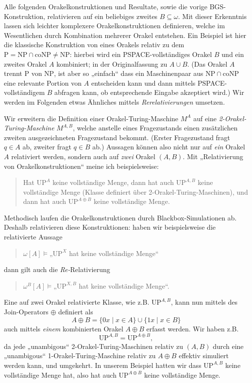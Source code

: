 \documentclass[nofonts]{uebung}
\theoremstyle{definition}
\def\P{\ensuremath{\mathrm{P}}}
\def\NP{\ensuremath{\mathrm{NP}}}
\def\UP{\ensuremath{\mathrm{UP}}}
\def\coNP{\ensuremath{\mathrm{coNP}}}
\begin{document}
Alle folgenden Orakelkonstruktionen und Resultate, sowie die vorige BGS-Konstruktion, relativieren auf ein beliebiges zweites $B\subseteq\omega$.
Mit dieser Erkenntnis lassen sich leichter komplexere Orakelkonstruktionen definieren, welche im Wesentlichen durch Kombination mehrerer Orakel entstehen. Ein Beispiel ist hier die klassische Konstruktion von \citeauthor{baker_relativizations_1975} eines Orakels relativ zu dem $\P=\NP\cap\coNP\neq\NP$: hierbei wird ein PSPACE-vollständiges Orakel $B$ und ein zweites Orakel $A$ kombiniert; in der Originalfassung zu $A\cup B$. (Das Orakel $A$ trennt $\P$ von $\NP$, ist aber so „einfach“ dass ein Maschinenpaar aus $\NP\cap\coNP$ eine relevante Portion von $A$ entscheiden kann und dann mittels PSPACE-vollständigem $B$ abfragen kann, ob entsprechende Eingabe akzeptiert wird.) Wir werden im Folgenden etwas Ähnliches mittels \emph{Rerelativierungen} umsetzen.

Wir erweitern die Definition einer Orakel-Turing-Maschine $M^A$ auf eine \emph{2-Orakel-Turing-Maschine} $M^{A,B}$, welche anstelle eines Fragezustands einen zusätzlichen zweiten ausgezeichneten Fragezustand bekommt. (Erster Fragezustand fragt $q\in A$ ab, zweiter fragt $q\in B$ ab.)
Aussagen können also nicht nur auf \emph{ein} Orakel $A$ relativiert werden, sondern auch auf \emph{zwei} Orakel $(A,B)$.
Mit „Relativierung von Orakelkonstruktionen“ meine ich beispielsweise: 
\begin{quote}
    Hat $\UP^A$ keine vollständige Menge, dann hat auch $\UP^{A,B}$ keine vollständige Menge (Klasse definiert über 2-Orakel-Turing-Maschinen), und dann hat auch $\UP^{A\oplus B}$ keine vollständige Menge.
\end{quote}

Methodisch laufen die Orakelkonstruktionen durch Blackbox-Simulationen ab. Deshalb relativieren diese Konstruktionen:
haben wir beispielsweise die relativierte Aussage \begin{quote}$\omega[A]\vDash „\UP^X$ hat keine vollständige Menge“\end{quote}  dann gilt auch die \emph{Re-}Relativierung \begin{quote}$\omega^B[A]\vDash „\UP^{X,B}$ hat keine vollständige Menge“.\end{quote}
Eine auf zwei Orakel relativierte Klasse, wie z.B. $\UP^{A,B}$, kann nun mittels des Join-Operators $\oplus$ definiert als
\[ A\oplus B = \{0x\mid x\in A\}\cup\{1x\mid x\in B\} \] 
auch mittels \emph{einem} kombinierten Orakel $A\oplus B$ erfasst werden. Wir haben z.B.
\[ \UP^{A,B} = \UP^{A\oplus B}, \]
da jede „unambigous“ 2-Orakel-Turing-Maschinen relativ zu $(A,B)$ durch eine „unambigous“ 1-Orakel-Turing-Maschine relativ zu $A\oplus B$ effektiv simuliert werden kann, und umgekehrt.
In unserem Beispiel hatten wir dass $\UP^{A,B}$ keine vollständige Menge hat, also hat auch $\UP^{A\oplus B}$ keine vollständige Menge.
\end{document}
